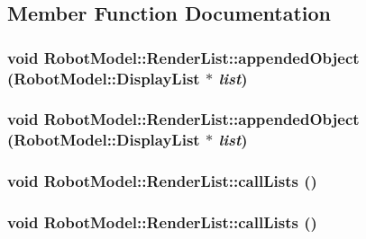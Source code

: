 \subsection{Member Function Documentation}
\hypertarget{class_robot_model_1_1_render_list_a635908222fa71402918e31eb2d725844}{
\subsubsection[{appendedObject}]{\setlength{\rightskip}{0pt plus 5cm}void RobotModel::RenderList::appendedObject ({\bf RobotModel::DisplayList} $\ast$ {\em list})}}
\label{class_robot_model_1_1_render_list_a635908222fa71402918e31eb2d725844}
\hypertarget{class_robot_model_1_1_render_list_a635908222fa71402918e31eb2d725844}{
\subsubsection[{appendedObject}]{\setlength{\rightskip}{0pt plus 5cm}void RobotModel::RenderList::appendedObject ({\bf RobotModel::DisplayList} $\ast$ {\em list})}}
\label{class_robot_model_1_1_render_list_a635908222fa71402918e31eb2d725844}
\hypertarget{class_robot_model_1_1_render_list_a7cd62d6e6376bc02bd4244dcc174b465}{
\subsubsection[{callLists}]{\setlength{\rightskip}{0pt plus 5cm}void RobotModel::RenderList::callLists ()}}
\label{class_robot_model_1_1_render_list_a7cd62d6e6376bc02bd4244dcc174b465}
\hypertarget{class_robot_model_1_1_render_list_a7cd62d6e6376bc02bd4244dcc174b465}{
\subsubsection[{callLists}]{\setlength{\rightskip}{0pt plus 5cm}void RobotModel::RenderList::callLists ()}}
